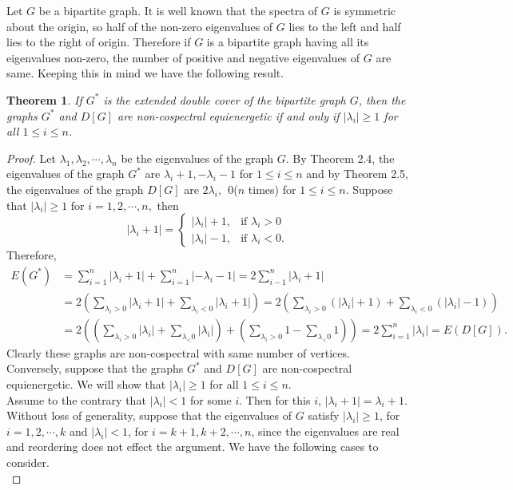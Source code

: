 \documentclass[12pt,a4paper]{amsart}
\newtheorem{theorem}{Theorem}[section]
\theoremstyle{theorem}
\theoremstyle{definition}
\numberwithin{equation}{section} \makeatletter
\begin{document}
\indent Let $G$ be a bipartite graph. It is well known that the spectra of $G$ is symmetric about the origin, so half of the non-zero eigenvalues of $G$ lies to the left and half lies to the right of origin. Therefore if $G$ is a bipartite graph having all its eigenvalues non-zero, the number of positive and negative eigenvalues of $G$ are same. Keeping this in mind we have the following result.
\begin{theorem}
If $G^*$ is the extended double cover of the bipartite graph $G$, then the graphs $G^*$ and $D[G]$ are non-cospectral equienergetic if and only if $|\lambda_i|\geq 1$ for all $ 1\leq i\leq n$.
\end{theorem}
\begin{proof}
Let $\lambda_1, \lambda_2, \cdots, \lambda_n$ be the eigenvalues of the graph $G$. By Theorem 2.4, the eigenvalues of the graph $G^*$ are $\lambda_i+1, -\lambda_i-1$ for $ 1\leq i\leq n$ and by Theorem 2.5, the eigenvalues of the graph $D[G]$ are $2\lambda_i,~~ 0 $($n$ times) for $1\leq i\leq n$. Suppose that $|\lambda_i|\geq 1$ for $i=1,2,\cdots,n,$ then
$$|\lambda_i+1|=\left \{\begin{array}{lr}|\lambda_i|+1, &\mbox{if $\lambda_i> 0$}\\
|\lambda_i|-1, &\mbox{if $\lambda_i< 0.$}
\end{array} \right.$$
Therefore,
\begin{align*}
E(G^*)&=\sum\limits_{i=1}^{n}|\lambda_i+1|+\sum\limits_{i=1}^{n}|-\lambda_i-1|=2\sum\limits_{i-1}^{n}|\lambda_i+1|\\&
=2\left (\sum\limits_{\lambda_i> 0}|\lambda_i+1|+\sum\limits_{\lambda_i <0}|\lambda_i+1| \right)
=2\left (\sum\limits_{\lambda_i> 0}(|\lambda_i|+1)+\sum\limits_{\lambda_i <0}(|\lambda_i|-1) \right)\\&
=2\left ((\sum\limits_{\lambda_i> 0}|\lambda_i|+\sum\limits_{\lambda_< 0}|\lambda_i|)+(\sum\limits_{\lambda_i> 0}1-\sum\limits_{\lambda_< 0}1) \right)=2\sum\limits_{i=1}^{n}|\lambda_i|=E(D[G]).
\end{align*}
\indent\indent Clearly these graphs are non-cospectral with same number of vertices.\\
Conversely, suppose that the graphs $G^*$ and $D[G]$ are non-cospectral equienergetic. We will show that $|\lambda_i|\geq 1$ for all $1\leq i\leq n$.\\
\indent Assume to the contrary that $|\lambda_i|< 1$ for some $i$. Then for this $i$, $|\lambda_i+1|=\lambda_i+1$. Without loss of generality, suppose that the eigenvalues of $G$ satisfy $|\lambda_i|\geq 1$, for $i=1,2,\cdots,k $ and $|\lambda_i|< 1$, for $i=k+1,k+2,\cdots,n$, since the eigenvalues are real and reordering does not effect the argument. We have the following cases to consider.\\

\end{proof}
\end{document}
